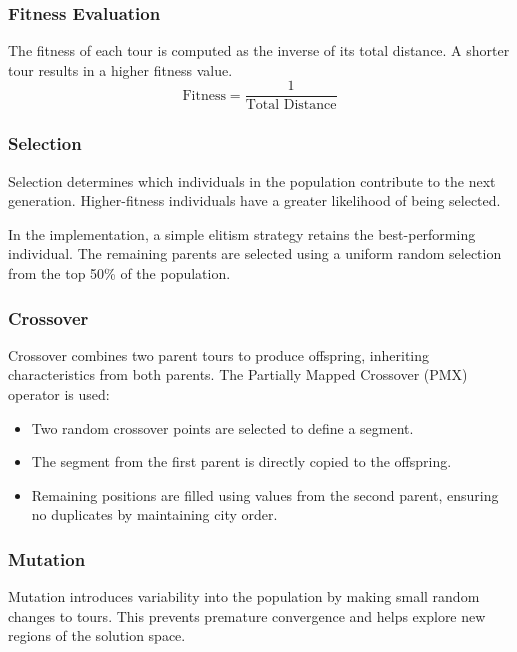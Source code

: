 \documentclass[conference]{IEEEtran}
\begin{document}
\subsubsection{Fitness Evaluation}

The fitness of each tour is computed as the inverse of its total distance. A shorter tour results in a higher fitness value.
\begin{equation}
     \text{Fitness} = \frac{1}{\text{Total Distance}}
\end{equation}

\subsubsection{Selection}

Selection determines which individuals in the population contribute to the next generation. Higher-fitness individuals have a greater likelihood of being selected.

In the implementation, a simple elitism strategy retains the best-performing individual. The remaining parents are selected using a uniform random selection from the top 50\% of the population.\\

\subsubsection{Crossover}

Crossover combines two parent tours to produce offspring, inheriting characteristics from both parents. The Partially Mapped Crossover (PMX) operator is used:

\begin{itemize}
    \item Two random crossover points are selected to define a segment.
    \item The segment from the first parent is directly copied to the offspring.
    \item Remaining positions are filled using values from the second parent, ensuring no duplicates by maintaining city order.\\
\end{itemize}

\subsubsection{Mutation}

Mutation introduces variability into the population by making small random changes to tours. This prevents premature convergence and helps explore new regions of the solution space.
\end{document}
